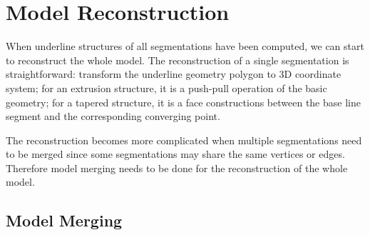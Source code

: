 

\section{Model Reconstruction}

When underline structures of all segmentations have been computed, we can start to reconstruct the whole model.
The reconstruction of a single segmentation is straightforward: transform the underline geometry polygon to
3D coordinate system; for an extrusion structure, it is a push-pull operation of the basic geometry;
for a tapered structure, it is a face constructions between the base line segment and the corresponding
converging point.

The reconstruction becomes more complicated when multiple segmentations need to be merged since
some segmentations may share the same vertices or edges. Therefore model merging needs to be done
for the reconstruction of the whole model.

\subsection{Model Merging}


